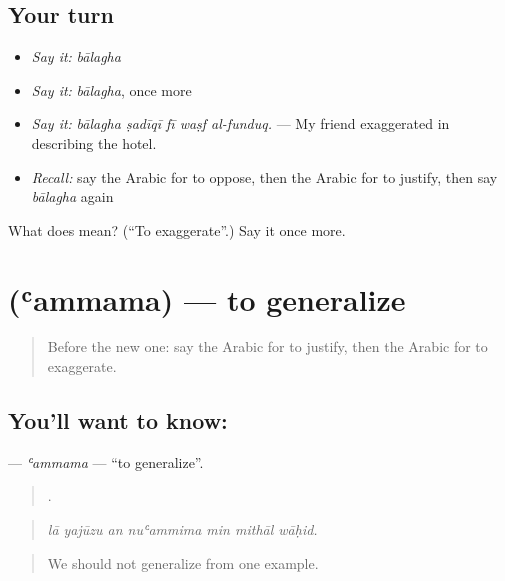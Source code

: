\subsection*{Your turn}
\begin{itemize}
\raggedright
  \item \emph{Say it:} \emph{bālagha}
  \item \emph{Say it:} \emph{bālagha}, once more
  \item \emph{Say it:} \emph{bālagha ṣadīqī fī waṣf al-funduq.} — My friend exaggerated in describing the hotel.
  \item \emph{Recall:} say the Arabic for to oppose, then the Arabic for to justify, then say \emph{bālagha} again
\end{itemize}

\begin{tcolorbox}[breakable,colback=teal!4,colframe=teal!35!black,title={Before you move on}]
What does  mean? (\textquotedblleft{}To exaggerate\textquotedblright{}.) Say it once more.
\end{tcolorbox}
\section[\texorpdfstring{\ar{عمم} (ʿammama)}{عمم (ʿammama)}]{ (ʿammama) — to generalize}

\label{lesson:AR-C370-ammama}



\begin{quote}
Before the new one: say the Arabic for to justify, then the Arabic for to exaggerate.
\end{quote}

\subsection*{You'll want to know: }
\textbf{} — \emph{ʿammama} — \textquotedblleft{}to generalize\textquotedblright{}.

\begin{quote}
      .
\end{quote}

\begin{quote}
\emph{lā yajūzu an nuʿammima min mithāl wāḥid.}
\end{quote}

\begin{quote}
We should not generalize from one example.
\end{quote}

